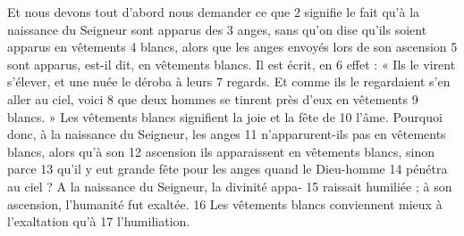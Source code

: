 Et nous devons tout d'abord nous demander ce que	 
2	 	signifie le fait qu'à la naissance du Seigneur sont apparus des	 
3	 	anges, sans qu'on dise qu'ils soient apparus en vêtements	 
4	 	blancs, alors que les anges envoyés lors de son ascension	 
5	 	sont apparus, est-il dit, en vêtements blancs. Il est écrit, en	 
6	 	effet : « Ils le virent s'élever, et une nuée le déroba à leurs	 
7	 	regards. Et comme ils le regardaient s'en aller au ciel, voici	 
8	 	que deux hommes se tinrent près d'eux en vêtements	 
9	 	blancs. » Les vêtements blancs signifient la joie et la fête de	 
10	 	l'âme. Pourquoi donc, à la naissance du Seigneur, les anges	 
11	 	n'apparurent-ils pas en vêtements blancs, alors qu'à son	 
12	 	ascension ils apparaissent en vêtements blancs, sinon parce	 
13	 	qu'il y eut grande fête pour les anges quand le Dieu-homme	 
14	 	pénétra au ciel ? A la naissance du Seigneur, la divinité appa-	 
15	 	raissait humiliée ; à son ascension, l'humanité fut exaltée.	 
16	 	Les vêtements blancs conviennent mieux à l'exaltation qu'à	 
17	 	l'humiliation.